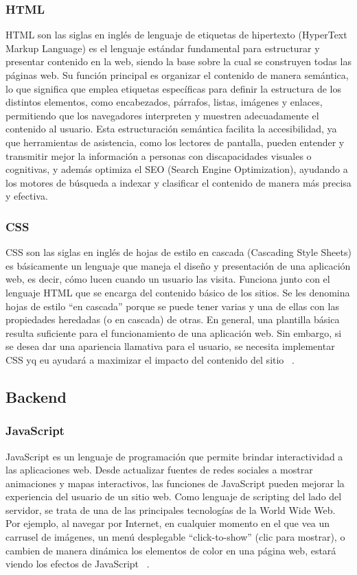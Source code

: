 \subsubsection{HTML}
HTML son las siglas en inglés de lenguaje de etiquetas de hipertexto (HyperText Markup Language) es el lenguaje estándar fundamental para estructurar y presentar contenido en la web, siendo la base sobre la cual se construyen todas las páginas web. Su función principal es organizar el contenido de manera semántica, lo que significa que emplea etiquetas específicas para definir la estructura de los distintos elementos, como encabezados, párrafos, listas, imágenes y enlaces, permitiendo que los navegadores interpreten y muestren adecuadamente el contenido al usuario. Esta estructuración semántica facilita la accesibilidad, ya que herramientas de asistencia, como los lectores de pantalla, pueden entender y transmitir mejor la información a personas con discapacidades visuales o cognitivas, y además optimiza el SEO (Search Engine Optimization), ayudando a los motores de búsqueda a indexar y clasificar el contenido de manera más precisa y efectiva. ~\cite{HTMLMDN}

\subsubsection{CSS}
CSS son las siglas en inglés de hojas de estilo en cascada (Cascading Style Sheets) es básicamente un lenguaje que maneja el diseño y presentación de una aplicación web, es decir, cómo lucen cuando un usuario las visita. Funciona junto con el lenguaje HTML que se encarga del contenido básico de los sitios. Se les denomina hojas de estilo “en cascada” porque se puede tener varias y una de ellas con las propiedades heredadas (o en cascada) de otras.
En general, una plantilla básica resulta suficiente para el funcionamiento de una aplicación web. Sin embargo, si se desea dar una apariencia llamativa para el usuario, se necesita implementar CSS yq eu ayudará a maximizar el impacto del contenido del sitio ~\cite{CSSMDN}.  

\subsection{Backend}

\subsubsection{JavaScript}
JavaScript es un lenguaje de programación que permite brindar interactividad a las aplicaciones web. Desde actualizar fuentes de redes sociales a mostrar animaciones y mapas interactivos, las funciones de JavaScript pueden mejorar la experiencia del usuario de un sitio web. Como lenguaje de scripting del lado del servidor, se trata de una de las principales tecnologías de la World Wide Web. Por ejemplo, al navegar por Internet, en cualquier momento en el que vea un carrusel de imágenes, un menú desplegable “click-to-show” (clic para mostrar), o cambien de manera dinámica los elementos de color en una página web, estará viendo los efectos de JavaScript ~\cite{JavascriptMDN}.



